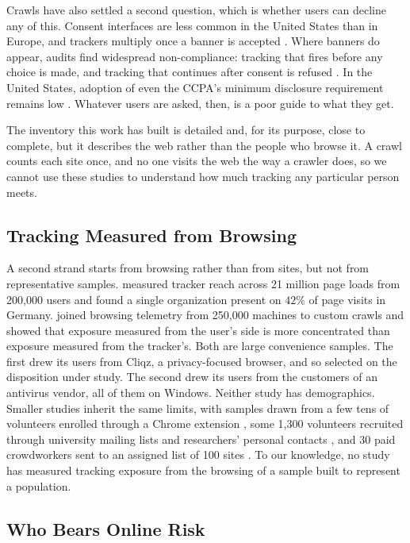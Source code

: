 \documentclass[12pt, letterpaper]{article}
\begin{document}
Crawls have also settled a second question, which is whether users can decline any of this. Consent interfaces are less common in the United States than in Europe, and trackers multiply once a banner is accepted \citep{jha2022consent}. Where banners do appear, audits find widespread non-compliance: tracking that fires before any choice is made, and tracking that continues after consent is refused \citep{matte2020cookiebanners, papadogiannakis2021postcookie}. In the United States, adoption of even the CCPA's minimum disclosure requirement remains low \citep{vannortwick2022ccpa}. Whatever users are asked, then, is a poor guide to what they get.

The inventory this work has built is detailed and, for its purpose, close to complete, but it describes the web rather than the people who browse it. A crawl counts each site once, and no one visits the web the way a crawler does, so we cannot use these studies to understand how much tracking any particular person meets.

\subsection{Tracking Measured from Browsing}
 
A second strand starts from browsing rather than from sites, but not from representative samples. \citet{trackingthetrackers} measured tracker reach across 21 million page loads from 200,000 users and found a single organization present on $42\%$ of page visits in Germany.
\citet{Dambra2022} joined browsing telemetry from 250,000 machines to custom crawls and showed that exposure measured from the user's side is more concentrated than exposure measured from the tracker's. Both are large convenience samples. The first drew its users from Cliqz, a privacy-focused browser, and so selected on the disposition under study. The second drew its users from the customers of an antivirus vendor, all of them on Windows. Neither study has demographics. Smaller studies inherit the same limits, with samples drawn from a few tens of volunteers enrolled through a Chrome extension \citep{hu2020multi}, some 1,300 volunteers recruited through university mailing lists and researchers' personal contacts \citep{pugliese2020long}, and 30 paid crowdworkers sent to an assigned list of 100 sites \citep{muthu2025beyond}.
To our knowledge, no study has measured tracking exposure from the browsing of a sample built to represent a population.

\subsection{Who Bears Online Risk}
 
\end{document}
